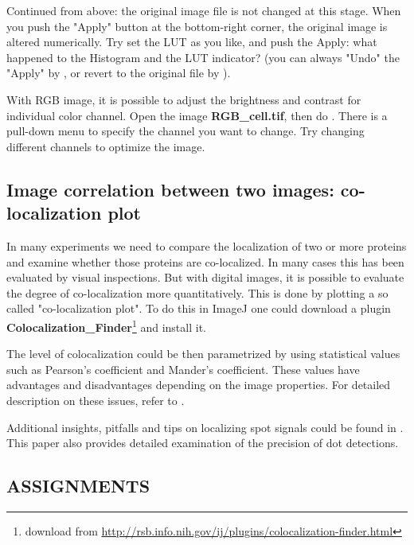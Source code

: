 \begin{indentexercise}{2}
Continued from above: the original image file
is not changed at this stage. When you push the
"Apply" button at the bottom-right
corner, the original image is altered numerically. Try set the LUT as
you like, and push the Apply: what happened to the Histogram and the
LUT indicator? (you can always
"Undo" the "Apply" by , 
or revert to the original file by ).
\end{indentexercise}

\begin{indentexercise}{3}
With RGB image, it is possible to adjust the
brightness and contrast for individual color channel. Open the image
\textbf{RGB\_cell.tif}, then do . 
There is a pull-down menu to specify
the channel you want to change. Try changing different channels to
optimize the image. 
\end{indentexercise}

\subsection{Image correlation between two images: co-localization plot}

In many experiments we need to compare the
localization of two or more proteins and examine whether those proteins
are co-localized. In many cases this has been evaluated by visual
inspections. But with digital images, it is possible to evaluate the
degree of co-localization more quantitatively. This is done by plotting
a so called "co-localization
plot". To do this in ImageJ one could download a
plugin \textbf{Colocalization\_Finder}\footnote{download from \url{http://rsb.info.nih.gov/ij/plugins/colocalization-finder.html}}
and install it.

The level of colocalization could be then parametrized by using statistical
values such as Pearson's coefficient and
Mander's coefficient. These values have advantages and
disadvantages depending on the image properties. For detailed
description on these issues, refer to \citet*{BolteJM2006}.

Additional insights, pitfalls and tips on localizing spot signals could
be found in \citet{Waters2009}. This paper also provides detailed examination of the precision of dot detections. 
\clearpage

\subsection{ASSIGNMENTS}

